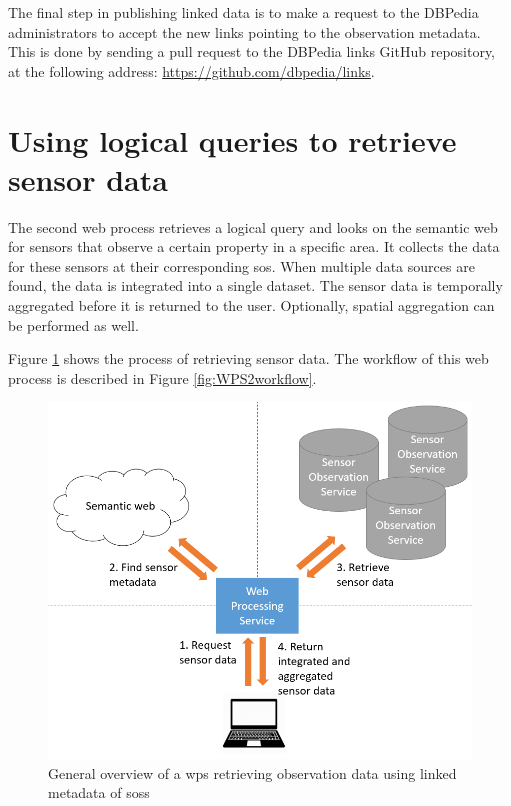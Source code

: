 The final step in publishing linked data is to make a request to the DBPedia administrators to accept the new links pointing to the observation metadata. This is done by sending a pull request to the DBPedia links GitHub repository, at the following address: \url{https://github.com/dbpedia/links}.


\section{Using logical queries to retrieve sensor data}
\label{par:logicalDesign}
The second web process retrieves a logical query and looks on the semantic web for sensors that observe a certain property in a specific area. It collects the data for these sensors at their corresponding \acl{sos}. When multiple data sources are found, the data is integrated into a single dataset. The sensor data is temporally aggregated before it is returned to the user. Optionally, spatial aggregation can be performed as well.

Figure \ref{fig:WPS2} shows the process of retrieving sensor data. The workflow of this web process is described in Figure \ref{fig:WPS2workflow}.

\begin{figure}
	\centering
	\includegraphics[width=0.8\linewidth]{UML/wps2diagram.PNG}
	\caption{General overview of a \acl*{wps} retrieving observation data using linked metadata of \aclp*{sos}}
	\label{fig:WPS2}
\end{figure}

